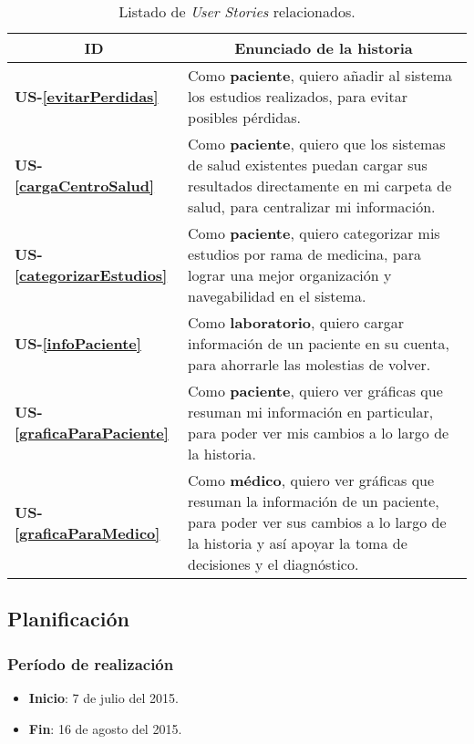 \begin{table}[h]
    \centering
	\begin{tabular}{|m{1.5cm}|m{11.5cm}|}
	\hline
        \multicolumn{1}{|c|}{\textbf{ID}} &
        \multicolumn{1}{c|}{\textbf{Enunciado de la historia}} \\          
    \hline
        \textbf{US-\ref{evitarPerdidas}} & Como \textbf{paciente}, quiero añadir al sistema los estudios realizados, para evitar posibles pérdidas.\\
     \hline 
        \textbf{US-\ref{cargaCentroSalud}} & Como \textbf{paciente}, quiero que los sistemas de salud existentes puedan cargar sus resultados directamente en mi carpeta de salud, para centralizar mi información. \\
      \hline 
        \textbf{US-\ref{categorizarEstudios}} & Como \textbf{paciente}, quiero categorizar mis estudios por rama de medicina, para lograr una mejor organización y navegabilidad en el sistema. \\
       \hline 
        \textbf{US-\ref{infoPaciente}} & Como \textbf{laboratorio}, quiero cargar información de un paciente en su cuenta, para ahorrarle las molestias de volver. \\
    \hline 
	    \textbf{US-\ref{graficaParaPaciente}} & Como \textbf{paciente}, quiero ver gráficas que resuman mi información en particular, para poder ver mis cambios a lo largo de la historia.\\
    \hline        
        \textbf{US-\ref{graficaParaMedico}} & Como \textbf{médico}, quiero ver gráficas que resuman la información de un paciente, para poder ver sus cambios a lo largo de la historia y así apoyar la toma de decisiones y el diagnóstico.\\
    \hline
    \end{tabular}
    \caption{Listado de \textit{User Stories} relacionados.}
    \label{US-Sprint3}
\end{table}


\subsection{Planificación}

\subsubsection{Período de realización}
\begin{itemize}
    \item \textbf{Inicio}: 7 de julio del 2015.
    \item \textbf{Fin}: 16 de agosto del 2015.
\end{itemize}

